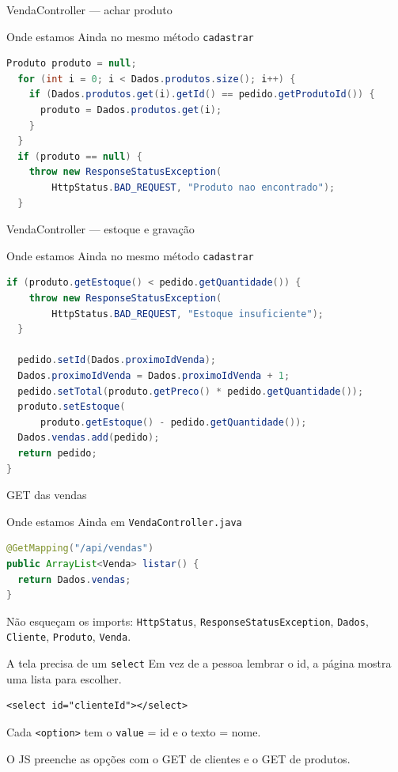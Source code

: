 \documentclass[aspectratio=169,11pt]{beamer}
\newcommand{\onde}[1]{%
  \begin{block}{Onde estamos}
    #1
  \end{block}
}
\begin{document}
\begin{frame}[fragile]{VendaController --- achar produto}
  \onde{Ainda no mesmo método \texttt{cadastrar}}

\begin{lstlisting}[language=Java,basicstyle=\ttfamily\footnotesize]
  Produto produto = null;
  for (int i = 0; i < Dados.produtos.size(); i++) {
    if (Dados.produtos.get(i).getId() == pedido.getProdutoId()) {
      produto = Dados.produtos.get(i);
    }
  }
  if (produto == null) {
    throw new ResponseStatusException(
        HttpStatus.BAD_REQUEST, "Produto nao encontrado");
  }
\end{lstlisting}
\end{frame}

\begin{frame}[fragile]{VendaController --- estoque e gravação}
  \onde{Ainda no mesmo método \texttt{cadastrar}}

\begin{lstlisting}[language=Java,basicstyle=\ttfamily\footnotesize]
  if (produto.getEstoque() < pedido.getQuantidade()) {
    throw new ResponseStatusException(
        HttpStatus.BAD_REQUEST, "Estoque insuficiente");
  }

  pedido.setId(Dados.proximoIdVenda);
  Dados.proximoIdVenda = Dados.proximoIdVenda + 1;
  pedido.setTotal(produto.getPreco() * pedido.getQuantidade());
  produto.setEstoque(
      produto.getEstoque() - pedido.getQuantidade());
  Dados.vendas.add(pedido);
  return pedido;
}
\end{lstlisting}
\end{frame}

\begin{frame}[fragile]{GET das vendas}
  \onde{Ainda em \texttt{VendaController.java}}

\begin{lstlisting}[language=Java,basicstyle=\ttfamily\footnotesize]
@GetMapping("/api/vendas")
public ArrayList<Venda> listar() {
  return Dados.vendas;
}
\end{lstlisting}

  \vspace{0.4em}
  Não esqueçam os imports:
  \texttt{HttpStatus}, \texttt{ResponseStatusException},
  \texttt{Dados}, \texttt{Cliente}, \texttt{Produto}, \texttt{Venda}.
\end{frame}

\begin{frame}[fragile]{A tela precisa de um \texttt{select}}
  Em vez de a pessoa lembrar o id, a página mostra uma lista
  para escolher.

  \vspace{0.4em}
\begin{lstlisting}[basicstyle=\ttfamily\footnotesize]
<select id="clienteId"></select>
\end{lstlisting}

  \vspace{0.4em}
  Cada \texttt{<option>} tem o \texttt{value} = id
  e o texto = nome.

  \vspace{0.5em}
  O JS preenche as opções com o GET de clientes
  e o GET de produtos.
\end{frame}
\end{document}

